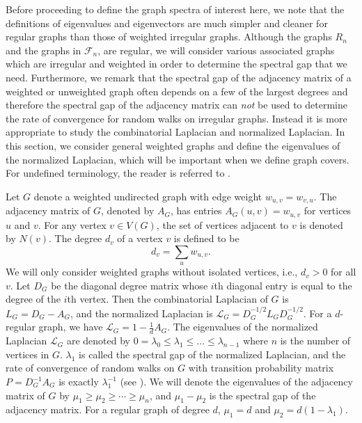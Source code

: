 Before proceeding to define the graph spectra of interest here, we note that
the definitions of eigenvalues and eigenvectors are much simpler and cleaner for regular graphs
than those of weighted irregular graphs. Although the graphs 
$R_n$ and the graphs in $\mathcal{F}_n$, are regular, we will consider various
associated graphs which are irregular and weighted in order to determine the spectral
gap that we need.
Furthermore, we remark that the spectral gap of the adjacency matrix of a weighted or unweighted graph often depends
on a few of the largest degrees and therefore the spectral gap of the adjacency matrix  can {\it  not}
be used to determine the rate of convergence for random walks on irregular graphs.  Instead it is more appropriate
to study the combinatorial Laplacian and normalized Laplacian.
In this section, we consider general weighted graphs and define the eigenvalues of the normalized Laplacian,
which will be important when we define graph covers.
For undefined terminology, the reader is referred to  \cite{Chung1997}.




Let $G$ denote a weighted undirected graph with edge weight $w_{u,v} = w_{v,u}$. The adjacency matrix
of $G$, denoted by $A_G$, has entries $A_G(u,v)= w_{u,v}$ for vertices $u$ and $v$.  For any
vertex $v \in V(G)$, the set of vertices adjacent to $v$ is denoted by $N(v)$.
The degree $d_v$ of a vertex $v$ is defined to be
\[ d_v = \sum_u w_{u,v}. \]
We will only consider weighted graphs without isolated vertices, i.e., $d_v > 0$ for all $v$.
Let $D_G$ be the diagonal 
degree matrix whose $i$th diagonal entry is equal to the degree of the $i$th
vertex.  Then the combinatorial Laplacian of $G$ is $L_G = D_G - A_G$, 
and the normalized Laplacian is $\mathcal{L}_G = D_G^{-1/2} L_G D_G^{-1/2}$.
For a $d$-regular graph, we have $\mathcal{L}_G =1 - \frac{1}{d} A_G$.
The eigenvalues of the normalized Laplacian $\mathcal{L}_G$ are denoted by
$0=\lambda_0 \leq \lambda_1 \leq \ldots \leq \lambda_{n-1}$ where $n$ is the number of vertices in $G$.
$\lambda_1$ is called the spectral gap of the normalized Laplacian, and the rate of convergence of random walks on $G$ 
with transition probability matrix $P=D_G^{-1} A_G$ is exactly $\lambda_1^{-1}$ (see \cite{Chung1997}).  We will denote the eigenvalues of 
the adjacency matrix of $G$ by $\mu_1 \geq \mu_2 \geq \cdots \geq \mu_n$,
and $\mu_1 - \mu_2$ is the spectral gap of the adjacency matrix. For a regular graph of degree $d$, $\mu_1=d$
and $\mu_2 = d (1-\lambda_1)$.

